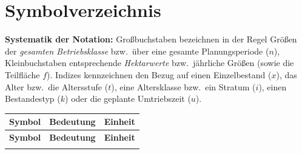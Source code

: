 \documentclass[twocolumn, paper=a4, fontsize=10pt]{scrartcl}
\begin{document}
\onecolumn
\section*{Symbolverzeichnis}

\noindent\textbf{Systematik der Notation:} Großbuchstaben bezeichnen in der Regel Größen der \emph{gesamten Betriebsklasse} bzw.\ über eine gesamte Planungsperiode ($n$), Kleinbuchstaben entsprechende \emph{Hektarwerte} bzw.\ jährliche Größen (sowie die Teilfläche $f$). Indizes kennzeichnen den Bezug auf einen Einzelbestand ($x$), das Alter bzw.\ die Altersstufe ($t$), eine Altersklasse bzw.\ ein Stratum ($i$), einen Bestandestyp ($k$) oder die geplante Umtriebszeit ($u$).

\begin{longtable}{@{}p{2.9cm}p{8.9cm}p{2.4cm}@{}}
\toprule
\textbf{Symbol} & \textbf{Bedeutung} & \textbf{Einheit} \\
\midrule
\endfirsthead

\toprule
\textbf{Symbol} & \textbf{Bedeutung} & \textbf{Einheit} \\
\midrule
\endhead

\bottomrule
\endfoot


\end{longtable}
\end{document}
